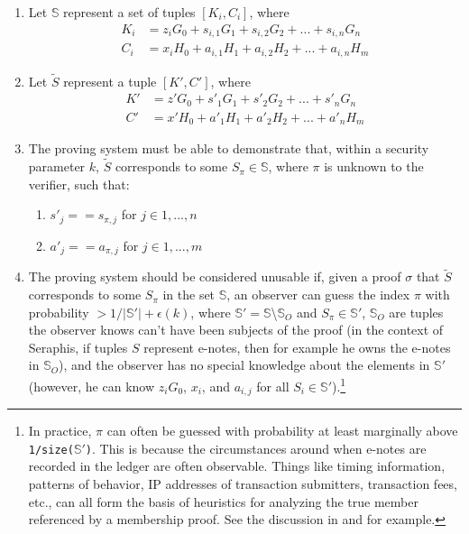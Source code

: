 \begin{enumerate}
    \item Let $\mathbb{S}$ represent a set of tuples $[K_i, C_i]$, where\vspace{.115cm}
    \begin{align*}
        K_i &= z_i G_0 + s_{i,1} G_1 + s_{i,2} G_2 + ... + s_{i,n} G_n \\
        C_i &= x_i H_0 + a_{i,1} H_1 + a_{i,2} H_2 + ... + a_{i,n} H_m
    \end{align*}

    \item Let $\tilde{S}$ represent a tuple $[K', C']$, where\vspace{.115cm}
    \begin{align*}
        K' &= z' G_0 + s'_1 G_1 + s'_2 G_2 + ... + s'_n G_n \\
        C' &= x' H_0 + a'_1 H_1 + a'_2 H_2 + ... + a'_n H_m
    \end{align*}

    \item The proving system must be able to demonstrate that, within a security parameter $k$, $\tilde{S}$ corresponds to some $S_{\pi} \in \mathbb{S}$, where $\pi$ is unknown to the verifier, such that:
    \begin{enumerate}
        \item $s'_j == s_{\pi,j}$ for $j \in 1,...,n$
        \item $a'_j == a_{\pi,j}$ for $j \in 1,...,m$
    \end{enumerate}

    \item The proving system should be considered unusable if, given a proof $\sigma$ that $\tilde{S}$ corresponds to some $S_{\pi}$ in the set $\mathbb{S}$, an observer can guess the index $\pi$ with probability $> 1/|\mathbb{S}'| + \epsilon(k)$, where $\mathbb{S}' = \mathbb{S}$\textbackslash$\mathbb{S}_O$ and $S_{\pi} \in \mathbb{S}'$, $\mathbb{S}_O$ are tuples the observer knows can't have been subjects of the proof (in the context of Seraphis, if tuples $S$ represent e-notes, then for example he owns the e-notes in $\mathbb{S}_O$), and the observer has no special knowledge about the elements in $\mathbb{S}'$ (however, he can know $z_i G_0$, $x_i$, and $a_{i,j}$ for all $S_i \in \mathbb{S}'$).\footnote{In practice, $\pi$ can often be guessed with probability at least marginally above {\tt 1/size(}$\mathbb{S}'${\tt )}. This is because the circumstances around when e-notes are recorded in the ledger are often observable. Things like timing information, patterns of behavior, IP addresses of transaction submitters, transaction fees, etc., can all form the basis of heuristics for analyzing the true member referenced by a membership proof. See the discussion in \cite{AnalysisOfLinkability} and \cite{foundations-ring-sampling} for example.}
\end{enumerate}


